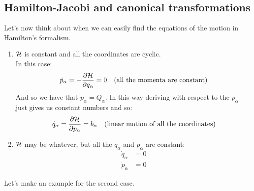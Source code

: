 \subsection{Hamilton-Jacobi and canonical transformations}
Let's now think about when we can easily find the equations of the motion in Hamilton's formalism.
\begin{enumerate}
  \item $\mathcal{H}$ is constant and all the coordinates are cyclic.\\
  In this case:
  \begin{equation}
    \dot{p}_{\alpha} = -\pdv{\hamfun}{q_{\alpha}} = 0 \quad \text{(all the momenta are constant)}
  \end{equation}
  And so we have that $p_{\alpha} = Q_{\alpha}$. In this way deriving with respect to the $p_{\alpha}$ just gives us constant numbers and so:
  \begin{equation}
    \dot{q}_{\alpha} = \pdv{\hamfun}{p_{\alpha}} = b_{\alpha} \quad \text{(linear motion of all the coordinates)}
  \end{equation}
  \item $\mathcal{H}$ may be whatever, but all the $q_{\alpha}$ and $p_{\alpha}$ are constant:
  \begin{equation}
    \begin{split}
      \dot{q}_{\alpha} &= 0\\[8pt]
      \dot{p}_{\alpha} &= 0
    \end{split}
  \end{equation}
\end{enumerate}
Let's make an example for the second case.
